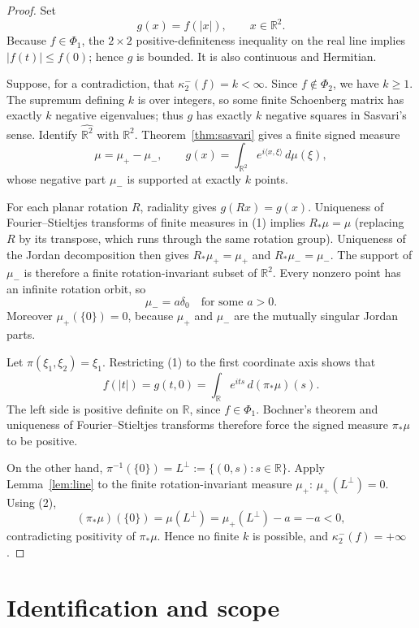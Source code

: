 \documentclass[11pt]{article}
\newcommand{\R}{\mathbb R}
\begin{document}
\begin{proof}
Set
\[
 g(x)=f(|x|),\qquad x\in\R^2.
\]
Because $f\in\Phi_1$, the $2\times2$ positive-definiteness inequality on
the real line implies $|f(t)|\leq f(0)$; hence $g$ is bounded.  It is also
continuous and Hermitian.

Suppose, for a contradiction, that $\kappa_2^-(f)=k<\infty$.  Since
$f\notin\Phi_2$, we have $k\geq1$.  The supremum defining $k$ is over
integers, so some finite Schoenberg matrix has exactly $k$ negative
eigenvalues; thus $g$ has exactly $k$ negative squares in Sasvari's sense.
Identify $\widehat{\R^2}$ with $\R^2$.  Theorem~\ref{thm:sasvari} gives a
finite signed measure
\[
 \mu=\mu_+-\mu_-,\qquad
 g(x)=\int_{\R^2}e^{i\langle x,\xi\rangle}\,d\mu(\xi),              \tag{1}
\]
whose negative part $\mu_-$ is supported at exactly $k$ points.

For each planar rotation $R$, radiality gives $g(Rx)=g(x)$.  Uniqueness of
Fourier--Stieltjes transforms of finite measures in (1) implies
$R_*\mu=\mu$ (replacing $R$ by its transpose, which runs through the same
rotation group).  Uniqueness of the Jordan decomposition then gives
$R_*\mu_+=\mu_+$ and $R_*\mu_-=\mu_-$.  The support of $\mu_-$ is therefore
a finite rotation-invariant subset of $\R^2$.  Every nonzero point has an
infinite rotation orbit, so
\[
 \mu_-=a\delta_0\quad\text{for some }a>0.                           \tag{2}
\]
Moreover $\mu_+(\{0\})=0$, because $\mu_+$ and $\mu_-$ are the mutually
singular Jordan parts.

Let $\pi(\xi_1,\xi_2)=\xi_1$.  Restricting (1) to the first coordinate
axis shows that
\[
 f(|t|)=g(t,0)=\int_{\R}e^{its}\,d(\pi_*\mu)(s).
\]
The left side is positive definite on $\R$, since $f\in\Phi_1$.
Bochner's theorem and uniqueness of Fourier--Stieltjes transforms therefore
force the signed measure $\pi_*\mu$ to be positive.

On the other hand, $\pi^{-1}(\{0\})=L^\perp:=\{(0,s):s\in\R\}$.  Apply
Lemma~\ref{lem:line} to the finite rotation-invariant measure $\mu_+$:
$\mu_+(L^\perp)=0$.  Using (2),
\[
 (\pi_*\mu)(\{0\})
 =\mu(L^\perp)
 =\mu_+(L^\perp)-a
 =-a<0,
\]
contradicting positivity of $\pi_*\mu$.  Hence no finite $k$ is possible,
and $\kappa_2^-(f)=+\infty$.
\end{proof}

\section{Identification and scope}
\end{document}
